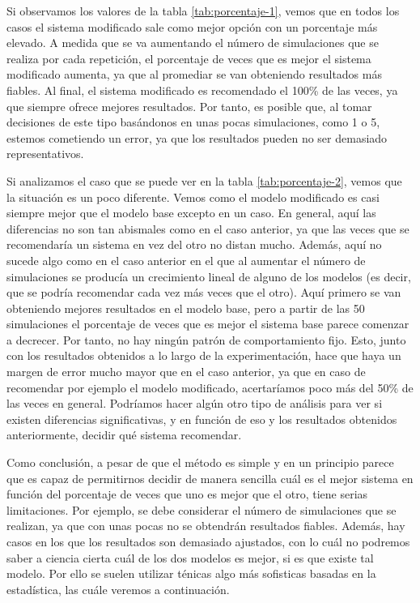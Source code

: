 \documentclass[11pt,a4paper]{article}
\begin{document}
Si observamos los valores de la tabla \ref{tab:porcentaje-1}, vemos que en todos
los casos el sistema modificado sale como mejor opción con un porcentaje más elevado.
A medida que se va aumentando el número de simulaciones que se realiza por cada
repetición, el porcentaje de veces que es mejor el sistema modificado
aumenta, ya que al promediar se van obteniendo resultados más fiables. Al final,
el sistema modificado es recomendado el 100\% de las veces, ya que siempre
ofrece mejores resultados. Por tanto, es posible que, al tomar decisiones de
este tipo basándonos en unas pocas simulaciones, como 1 o 5, estemos cometiendo
un error, ya que los resultados pueden no ser demasiado representativos.

Si analizamos el caso que se puede ver en la tabla \ref{tab:porcentaje-2}, vemos
que la situación es un poco diferente. Vemos como el modelo modificado es casi siempre
mejor que el modelo base excepto en un caso. En general, aquí las diferencias no son
tan abismales como en el caso anterior, ya que las veces que se recomendaría un sistema
en vez del otro no distan mucho. Además, aquí no sucede algo como en el caso anterior en
el que al aumentar el número de simulaciones se producía un crecimiento lineal de alguno
de los modelos (es decir, que se podría recomendar cada vez más veces que el otro). Aquí
primero se van obteniendo mejores resultados en el modelo base, pero a partir de
las 50 simulaciones el porcentaje de veces que es mejor el sistema base
parece comenzar a decrecer. Por tanto, no hay ningún patrón de comportamiento
fijo. Esto, junto con los resultados obtenidos a lo largo de la experimentación,
hace que haya un margen de error mucho mayor que en el caso anterior, ya que en
caso de recomendar por ejemplo el modelo modificado, acertaríamos poco más del
50\% de las veces en general. Podríamos hacer algún otro tipo de análisis para
ver si existen diferencias significativas, y en función de eso y los resultados
obtenidos anteriormente, decidir qué sistema recomendar.

Como conclusión, a pesar de que el método es simple y en un principio parece que
es capaz de permitirnos decidir de manera sencilla cuál es el mejor sistema en
función del porcentaje de veces que uno es mejor que el otro, tiene serias
limitaciones. Por ejemplo, se debe considerar el número de simulaciones que
se realizan, ya que con unas pocas no se obtendrán resultados fiables. Además,
hay casos en los que los resultados son demasiado ajustados, con lo cuál no
podremos saber a ciencia cierta cuál de los dos modelos es mejor, si es que
existe tal modelo. Por ello se suelen utilizar ténicas algo más sofisticas
basadas en la estadística, las cuále veremos a continuación.
\end{document}
